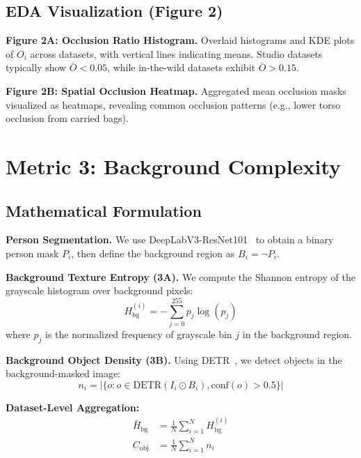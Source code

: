 \documentclass[runningheads]{llncs}
\begin{document}
\subsection{EDA Visualization (Figure 2)}

\textbf{Figure 2A: Occlusion Ratio Histogram.} Overlaid histograms and KDE plots of $O_i$ across datasets, with vertical lines indicating means. Studio datasets typically show $\bar{O} < 0.05$, while in-the-wild datasets exhibit $\bar{O} > 0.15$.

\textbf{Figure 2B: Spatial Occlusion Heatmap.} Aggregated mean occlusion masks visualized as heatmaps, revealing common occlusion patterns (e.g., lower torso occlusion from carried bags).


\section{Metric 3: Background Complexity}
\label{sec:m3_background}

\subsection{Mathematical Formulation}

\textbf{Person Segmentation.} We use DeepLabV3-ResNet101~\cite{chen2017deeplab} to obtain a binary person mask $P_i$, then define the background region as $B_i = \neg P_i$.

\textbf{Background Texture Entropy (3A).} We compute the Shannon entropy of the grayscale histogram over background pixels:
\begin{equation}
    H_{\text{bg}}^{(i)} = -\sum_{j=0}^{255} p_j \log(p_j)
\end{equation}
where $p_j$ is the normalized frequency of grayscale bin $j$ in the background region.

\textbf{Background Object Density (3B).} Using DETR~\cite{carion2020detr}, we detect objects in the background-masked image:
\begin{equation}
    n_i = |\{o : o \in \text{DETR}(I_i \odot B_i), \text{conf}(o) > 0.5\}|
\end{equation}

\textbf{Dataset-Level Aggregation:}
\begin{align}
    \bar{H}_{\text{bg}} &= \frac{1}{N}\sum_{i=1}^{N} H_{\text{bg}}^{(i)} \\
    C_{\text{obj}} &= \frac{1}{N}\sum_{i=1}^{N} n_i
\end{align}
\end{document}

